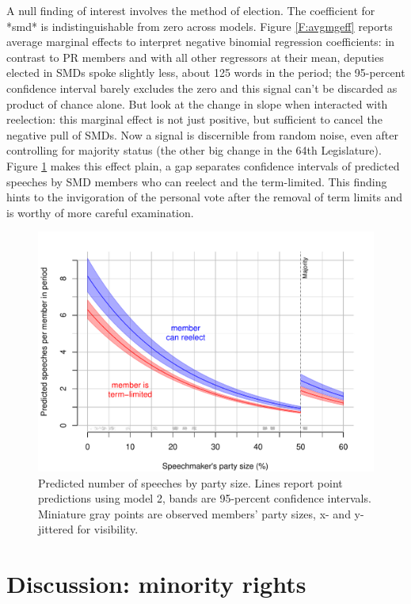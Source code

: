 \documentclass[letter,12pt]{article}
\begin{document}
A null finding of interest involves the method of election. The coefficient for *smd* is indistinguishable from zero across models. Figure \ref{F:avgmgeff} reports average marginal effects to interpret negative binomial regression coefficients: in contrast to PR members and with all other regressors at their mean, deputies elected in SMDs spoke slightly less, about 125 words in the period; the 95-percent confidence interval barely excludes the zero and this signal can't be discarded as product of chance alone. But look at the change in slope when interacted with reelection: this marginal effect is not just positive, but sufficient to cancel the negative pull of SMDs. Now a signal is discernible from random noise, even after controlling for majority status (the other big change in the 64th Legislature). Figure \ref{F:predict} makes this effect plain, a gap separates confidence intervals of predicted speeches by SMD members who can reelect and the term-limited. This finding hints to the invigoration of the personal vote after the removal of term limits and is worthy of more careful examination. 

\begin{figure}
  \centering
    \includegraphics[width=.67\columnwidth]{../plots/predictedWords.pdf}
    \caption{Predicted number of speeches by party size. Lines report point predictions using model 2, bands are 95-percent confidence intervals. Miniature gray points are observed members' party sizes, x- and y-jittered for visibility.}\label{F:predict}
\end{figure}



\section{Discussion: minority rights} %

\end{document}
